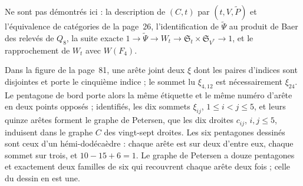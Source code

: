 Ne sont pas démontrés ici : la description de $(C, t)$ par $(t, V, \widetilde P)$ et l'équivalence de catégories de la page~26, l'identification de $\widetilde\Psi$ au produit de Baer des relevés de $Q_8$, la suite exacte $1 \to \widetilde\Psi \to W_t \to \mathfrak S_t \times \mathfrak S_{V^*} \to 1$, et le rapprochement de $W_t$ avec $W(F_4)$.

\begin{encadre}
\begin{theoreme*}
Dans la figure de la page~81, une arête joint deux $\xi$ dont les paires d'indices sont disjointes et porte le cinquième indice ; le sommet lu $\xi_{4,12}$ est nécessairement $\xi_{24}$. Le pentagone de bord porte alors la même étiquette et le même numéro d'arête en deux points opposés ; identifiés, les dix sommets $\xi_{ij}$, $1 \leq i < j \leq 5$, et leurs quinze arêtes forment le graphe de Petersen, que les dix droites $c_{ij}$, $i, j \leq 5$, induisent dans le graphe $C$ des vingt-sept droites. Les six pentagones dessinés sont ceux d'un hémi-dodécaèdre : chaque arête est sur deux d'entre eux, chaque sommet sur trois, et $10 - 15 + 6 = 1$. Le graphe de Petersen a douze pentagones et exactement deux familles de six qui recouvrent chaque arête deux fois ; celle du dessin en est une.
\end{theoreme*}
\end{encadre}
